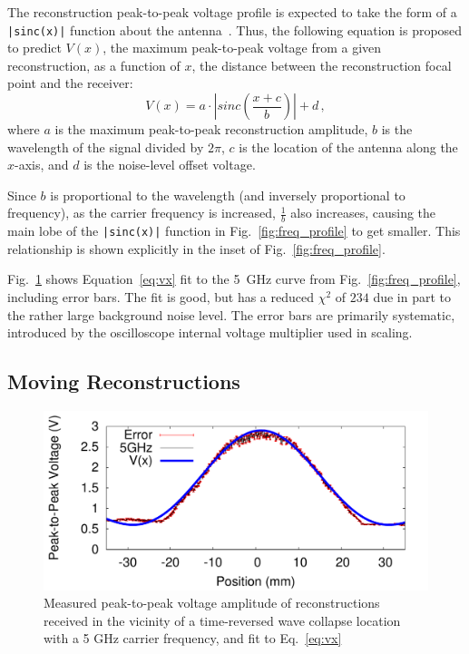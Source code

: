 The reconstruction peak-to-peak voltage profile is expected to take the form of
a \texttt{|sinc(x)|} function about the antenna~\cite{lerosey-focusing}.
%
Thus, the following equation is proposed to predict $V(x)$, the maximum
peak-to-peak voltage from a given reconstruction, as a function of $x$, the
distance between the reconstruction focal point and the receiver:
%
\begin{equation}\label{eq:vx}
V(x)=a\cdot \left|sinc\left(\frac{x+c}{b}\right)\right|+d\,,
\end{equation}
%
\noindent where $a$ is the maximum peak-to-peak reconstruction amplitude, $b$ is
the wavelength of the signal divided by $2\pi$, $c$ is the location of the
antenna along the $x$-axis, and $d$ is the noise-level offset voltage.



Since $b$ is proportional to the wavelength (and inversely proportional to
frequency), as the carrier frequency is increased, $\frac{1}{b}$ also increases,
causing the main lobe of the \texttt{|sinc(x)|} function in
Fig.~\ref{fig:freq_profile} to get smaller.
%
This relationship is shown explicitly in the inset of
Fig.~\ref{fig:freq_profile}.



Fig.~\ref{fig:error_fit} shows Equation~\ref{eq:vx} fit to the 5~GHz curve from
Fig.~\ref{fig:freq_profile}, including error bars.
%
The fit is good, but has a reduced $\chi^2$ of $234$ due in part to the rather
large background noise level.
%
The error bars are primarily systematic, introduced by the oscilloscope internal
voltage multiplier used in scaling.

\subsection{Moving Reconstructions}
\label{sec:moving}


\begin{figure}[t!]
\includegraphics[width=\columnwidth]{figs/fit.pdf}
\caption{Measured peak-to-peak voltage amplitude of reconstructions received in the
vicinity of a time-reversed wave collapse location with a 5 GHz carrier
frequency, and fit to Eq.~\ref{eq:vx}}
\label{fig:error_fit}
\end{figure}


